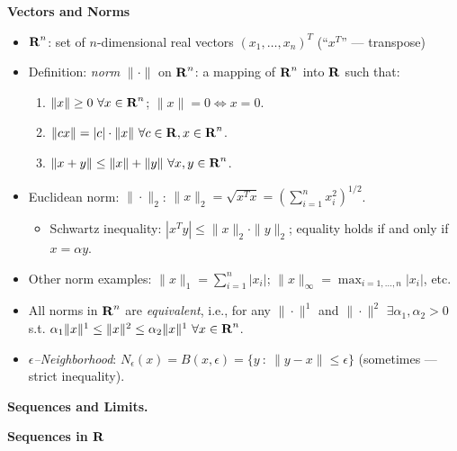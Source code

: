 \documentclass[11pt]{article}
\begin{document}
\begin{center}
\textbf{Vectors and Norms}
\end{center}
\begin{itemize}
\item ${\mbox{\textbf{R}}}^n$: set of $n$-dimensional real vectors $(x_1,\ldots,x_n)^T$ (``$x^T$'' --- transpose)
\item Definition: \emph{norm} $\|\cdot\|$ on ${\mbox{\textbf{R}}}^n$: a mapping of ${\mbox{\textbf{R}}}^n$ into ${\mbox{\textbf{R}}}$ such that:
\begin{enumerate}
\item$\|x\|\ge0\ \forall x\in{\mbox{\textbf{R}}}^n$; $\|x\|=0\Leftrightarrow x=0$. 
\item$\|cx\|=|c|\cdot\|x\|\ \forall c\in {\mbox{\textbf{R}}},x\in{\mbox{\textbf{R}}}^n$.
\item$\|x+y\|\le\|x\|+\|y\|\ \forall x,y\in {\mbox{\textbf{R}}}^n$.
\end{enumerate}

\item Euclidean norm: $\|\cdot\|_2$: $\|x\|_2=\sqrt{x^Tx}=\left(\sum_{i=1}^nx_i^2\right)^{1/2}$.
\begin{itemize}
\item Schwartz inequality: $|x^Ty|\le\|x\|_2\cdot\|y\|_2$; equality holds if and only if $x=\alpha y$.
\end{itemize}
\item Other norm examples: $\|x\|_1=\sum_{i=1}^n|x_i|$; $\|x\|_\infty=\max_{i=1,\ldots,n}|x_i|$, etc.
\item All norms in ${\mbox{\textbf{R}}}^n$ are \emph{equivalent}, i.e., for any $\|\cdot\|^1$ and $\|\cdot\|^2$
$\exists\alpha_1,\alpha_2>0$ s.t. $\alpha_1\|x\|^1\le\|x\|^2\le\alpha_2\|x\|^1\ \forall x\in\reals^n$.
\item \emph{$\epsilon$--Neighborhood}:  $N_\epsilon(x)=B(x,\epsilon)=\{y\ :\ \|y-x\|\le\epsilon\}$ (sometimes --- strict inequality).
\end{itemize}
\begin{center}
\textbf{Sequences and Limits.}
\end{center}
\textbf{Sequences in ${\mbox{\textbf{R}}}$}
\end{document}
